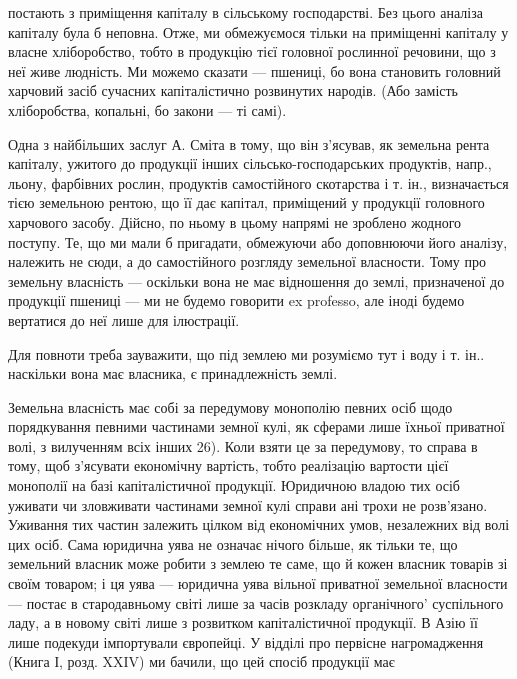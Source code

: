 постають з приміщення капіталу в сільському господарстві. Без цього аналіза
капіталу була б неповна. Отже, ми обмежуємося тільки на приміщенні капіталу
у власне хліборобство, тобто в продукцію тієї головної рослинної речовини, що
з неї живе людність. Ми можемо сказати — пшениці, бо вона становить головний
харчовий засіб сучасних капіталістично розвинутих народів. (Або замість
хліборобства, копальні, бо закони — ті самі).

Одна з найбільших заслуг А. Сміта в тому, що він з’ясував, як земельна
рента капіталу, ужитого до продукції інших сільсько-господарських продуктів,
напр., льону, фарбівних рослин, продуктів самостійного скотарства і т. ін., визначається
тією земельною рентою, що її дає капітал, приміщений у продукції
головного харчового засобу. Дійсно, по ньому в цьому напрямі не зроблено жодного
поступу. Те, що ми мали б пригадати, обмежуючи або доповнюючи його
аналізу, належить не сюди, а до самостійного розгляду земельної власности.
Тому про земельну власність — оскільки вона не має відношення до землі, призначеної
до продукції пшениці — ми не будемо говорити ex professo, але іноді
будемо вертатися до неї лише для ілюстрації.

Для повноти треба зауважити, що під землею ми розуміємо тут і воду і т. ін..
наскільки вона має власника, є принадлежність землі.

Земельна власність має собі за передумову монополію певних осіб щодо
порядкування певними частинами земної кулі, як сферами лише їхньої приватної
волі, з вилученням всіх інших 26). Коли взяти це за передумову, то
справа в тому, щоб з’ясувати економічну вартість, тобто реалізацію вартости
цієї монополії на базі капіталістичної продукції. Юридичною владою тих осіб
уживати чи зловживати частинами земної кулі справи ані трохи не розв’язано.
Уживання тих частин залежить цілком від економічних умов, незалежних від
волі цих осіб. Сама юридична уява не означає нічого більше, як тільки те, що
земельний власник може робити з землею те саме, що й кожен власник
товарів зі своїм товаром; і ця уява — юридична уява вільної приватної земельної
власности — постає в стародавньому світі лише за часів розкладу органічного'
суспільного ладу, а в новому світі лише з розвитком капіталістичної продукції.
В Азію її лише подекуди імпортували європейці. У відділі про первісне нагромадження
(Книга І, розд. XXIV) ми бачили, що цей спосіб продукції має

